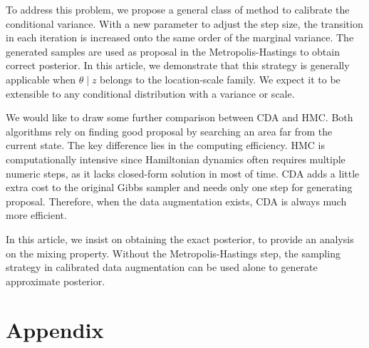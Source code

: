 \documentclass[10pt]{article}
\begin{document}
To address this problem, we propose a general class of method to calibrate the conditional variance. With a new parameter to adjust the step size, the transition in each iteration is increased onto the same order of the marginal variance. The generated samples are used as proposal in the Metropolis-Hastings to obtain correct posterior. In this article, we demonstrate that this strategy is generally applicable when $\theta \mid z$ belongs to the location-scale family. We expect it to be extensible to any conditional distribution with a variance or scale.

We would like to draw some further comparison between CDA and HMC. Both algorithms rely on finding good proposal by searching an area far from the current state. The key difference lies in the computing efficiency. HMC is computationally intensive since Hamiltonian dynamics often requires multiple numeric steps, as it lacks closed-form solution in most of time. CDA adds a little extra cost to the original Gibbs sampler and needs only one step for generating proposal. Therefore, when the data augmentation exists, CDA is always much more efficient.

In this article, we insist on obtaining the exact posterior, to provide an analysis on the mixing property. Without the Metropolis-Hastings step, the sampling strategy in calibrated data augmentation can be used alone to generate approximate posterior.





\section{Appendix}
\end{document}
